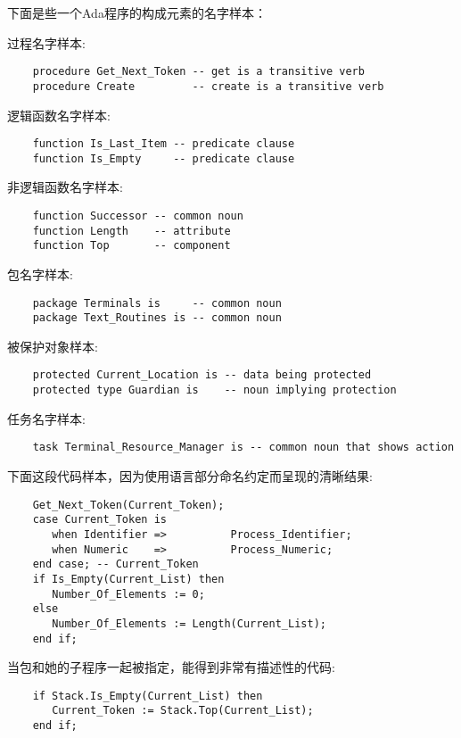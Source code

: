 \begin{blockindent}
\noindent
下面是些一个Ada程序的构成元素的名字样本：

过程名字样本:
\begin{lstlisting}
    procedure Get_Next_Token -- get is a transitive verb
    procedure Create         -- create is a transitive verb
\end{lstlisting}

逻辑函数名字样本:
\begin{lstlisting}
    function Is_Last_Item -- predicate clause
    function Is_Empty     -- predicate clause
\end{lstlisting}

非逻辑函数名字样本:
\begin{lstlisting}
    function Successor -- common noun
    function Length    -- attribute
    function Top       -- component
\end{lstlisting}

包名字样本:
\begin{lstlisting}
    package Terminals is     -- common noun
    package Text_Routines is -- common noun
\end{lstlisting}

被保护对象样本:
\begin{lstlisting}
    protected Current_Location is -- data being protected
    protected type Guardian is    -- noun implying protection
\end{lstlisting}

任务名字样本:
\begin{lstlisting}
    task Terminal_Resource_Manager is -- common noun that shows action
\end{lstlisting}

下面这段代码样本，因为使用语言部分命名约定而呈现的清晰结果:
\begin{lstlisting}
    Get_Next_Token(Current_Token);
    case Current_Token is
       when Identifier =>          Process_Identifier;
       when Numeric    =>          Process_Numeric;
    end case; -- Current_Token
    if Is_Empty(Current_List) then
       Number_Of_Elements := 0;
    else
       Number_Of_Elements := Length(Current_List);
    end if;
\end{lstlisting}

当包和她的子程序一起被指定，能得到非常有描述性的代码:
\begin{lstlisting}
    if Stack.Is_Empty(Current_List) then
       Current_Token := Stack.Top(Current_List);
    end if;
\end{lstlisting}
\end{blockindent}

